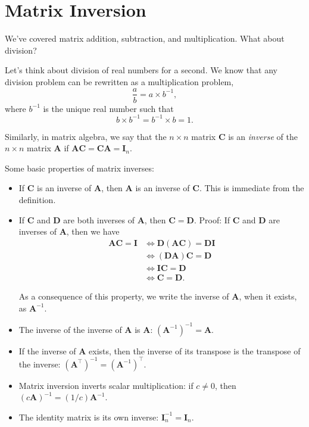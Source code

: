 \documentclass[
  12pt,
  oneside,openany]{book}
\begin{document}
\hypertarget{matrix-inversion}{%
\section{Matrix Inversion}\label{matrix-inversion}}

We've covered matrix addition, subtraction, and multiplication. What about division?

Let's think about division of real numbers for a second. We know that any division problem can be rewritten as a multiplication problem,
\[
\frac{a}{b} = a \times b^{-1},
\]
where \(b^{-1}\) is the unique real number such that
\[
b \times b^{-1} = b^{-1} \times b = 1.
\]

Similarly, in matrix algebra, we say that the \(n \times n\) matrix \(\mathbf{C}\) is an \emph{inverse} of the \(n \times n\) matrix \(\mathbf{A}\) if \(\mathbf{A} \mathbf{C} = \mathbf{C} \mathbf{A} = \mathbf{I}_n\).

Some basic properties of matrix inverses:

\begin{itemize}
\item
  If \(\mathbf{C}\) is an inverse of \(\mathbf{A}\), then \(\mathbf{A}\) is an inverse of \(\mathbf{C}\). This is immediate from the definition.
\item
  If \(\mathbf{C}\) and \(\mathbf{D}\) are both inverses of \(\mathbf{A}\), then \(\mathbf{C} = \mathbf{D}\). Proof: If \(\mathbf{C}\) and \(\mathbf{D}\) are inverses of \(\mathbf{A}\), then we have
  \[
  \begin{aligned}
  \mathbf{A} \mathbf{C} = \mathbf{I}
  &\Leftrightarrow \mathbf{D} (\mathbf{A} \mathbf{C}) = \mathbf{D} \mathbf{I} \\
  &\Leftrightarrow (\mathbf{D} \mathbf{A}) \mathbf{C} = \mathbf{D} \\
  &\Leftrightarrow \mathbf{I} \mathbf{C} = \mathbf{D} \\
  &\Leftrightarrow \mathbf{C} = \mathbf{D}.
  \end{aligned}
  \]

  As a consequence of this property, we write the inverse of \(\mathbf{A}\), when it exists, as \(\mathbf{A}^{-1}\).
\item
  The inverse of the inverse of \(\mathbf{A}\) is \(\mathbf{A}\): \((\mathbf{A}^{-1})^{-1} = \mathbf{A}\).
\item
  If the inverse of \(\mathbf{A}\) exists, then the inverse of its transpose is the transpose of the inverse: \((\mathbf{A}^\top)^{-1} = (\mathbf{A}^{-1})^\top\).
\item
  Matrix inversion inverts scalar multiplication: if \(c \neq 0\), then \((c \mathbf{A})^{-1} = (1/c) \mathbf{A}^{-1}\).
\item
  The identity matrix is its own inverse: \(\mathbf{I}_n^{-1} = \mathbf{I}_n\).
\end{itemize}
\end{document}
